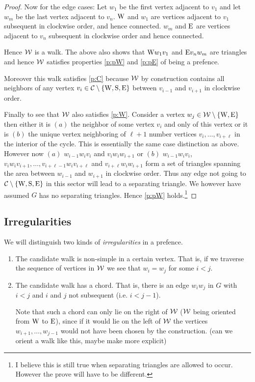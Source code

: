 \begin{proof}
Now for the edge cases: Let $w_1$ be the first vertex adjacent to $v_1$ and let $w_m$ be the last vertex adjacent to $v_n$. $\mathrm{W}$ and $w_1$ are vertices adjacent to $v_1$ subsequent in clockwise order, and hence connected. $w_m$ and $\mathrm{E}$ are vertices adjacent to $v_n$ subsequent in clockwise order and hence connected.

Hence $\mathcal{W}$ is a walk. The above also shows that $\mathrm{W} w_1 v_1$ and $\mathrm{E} v_n w_m$ are triangles and hence $\mathcal{W}$ satisfies properties \ref{p:pW} and \ref{p:pE} of being a prefence.

Moreover this walk satisfies  \ref{p:C} because $\mathcal{W}$ by construction contains all neighbors of any vertex $v_i \in \mathcal{C} \setminus \left\lbrace {\mathrm{W}, \mathrm{S}, \mathrm{E}} \right\rbrace$ between $v_{i-1}$ and $v_{i+1}$ in clockwise order.

Finally to see that $\mathcal{W}$ also satisfies \ref{p:W}. Consider a vertex $w_j \in \mathcal{W} \setminus \left\lbrace {\mathrm{W}, \mathrm{E}} \right\rbrace$ then either it is $(a)$ the neighbor of some vertex $v_i$ and only of this vertex or it is $(b)$ the unique vertex neighboring of $\ell +1$ number vertices $v_i, \ldots, v_{i+\ell}$ in the interior of the cycle. This is essentially the same case distinction as above. However now $(a)$ $w_{i-1} w_i v_i$ and $v_i w_i w_{i+1}$ or $(b)$ $w_{i-1} w_i v_i$, $v_i w_i v_{i+1}, \ldots, v_{i+\ell -1} w_i v_{i+\ell} $
 and $v_{i+\ell} w_i w_{i+1}$ form a set of triangles spanning the area between $w_{i-1}$ and $w_{i+1}$ in clockwise order. Thus any edge not going to $\mathcal{C} \setminus \left\lbrace {\mathrm{W}, \mathrm{S}, \mathrm{E}} \right\rbrace$ in this sector will lead to a separating triangle. We however have assumed $G$ has no separating triangles. Hence \ref{p:pW} holds.\footnote{I believe this is still true when separating triangles are allowed to occur. However the prove will have to be different.}
\end{proof}






\subsection{Irregularities}
We will distinguish two kinds of \emph{irregularities} in a prefence.
\begin{enumerate}
\item The candidate walk is non-simple in a certain vertex. That is, if we traverse the sequence of vertices in $\mathcal{W}$ we see that $w_i = w_j$ for some $i<j$.
\item The candidate walk has a chord. That is, there is an edge $w_i w_j$ in $G$ with $i<j$ and $i$ and $j$ not subsequent (i.e. $i < j-1$).

Note that such a chord can only lie on the right of $\mathcal{W}$ ($\mathcal{W}$ being oriented from $\mathrm{W}$ to $\mathrm{E}$), since if it would lie on the left of $\mathcal{W}$ the vertices $w_{i+1},\ldots, w_{j-1}$ would not have been chosen by the construction. \fxnote(can we orient a walk like this, maybe make more explicit)
\end{enumerate}

